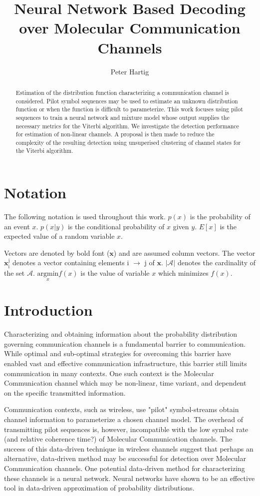 \documentclass[12pt,a4paper]{article}
\title{Neural Network Based Decoding over Molecular Communication Channels}
\author{Peter Hartig}
\begin{document}
\maketitle

\begin{abstract}
Estimation of the distribution function characterizing a communication channel is considered. Pilot symbol sequences may be used to estimate an unknown distribution function or when the function is difficult to parameterize. This work focuses using pilot sequences to train a neural network and mixture model whose output supplies the necessary metrics for the Viterbi algorithm. We investigate the detection performance for estimation of non-linear channels. A proposal is then made to reduce the complexity of the resulting detection using unsuperised clustering of channel states for the Viterbi algorithm. 
\end{abstract}

\newpage
\tableofcontents
\newpage
\section{Notation}
The following notation is used throughout this work.
$p(x)$ is the probability of an event $x$.
$p(x|y)$ is the conditional probability of $x$ given $y$.
$E[x]$ is the expected value of a random variable $x$.

Vectors  are denoted by bold font ($\mathbf{x}$) and are assumed column vectors.
The vector $\mathbf{x}_{\mathrm{i}}^{\mathrm{j}}$ denotes a vector containing elements i $\rightarrow$ j of $\mathbf{x}$. $|\mathcal{A}|$ denotes the cardinality of the set $\mathcal{A}$.
$\underset{x}{\text{argmin}} f(x)$ is the value of variable $x$ which minimizes $f(x)$.

\section{Introduction}
Characterizing and obtaining information about the probability distribution governing communication channels is a fundamental barrier to communication. While optimal and sub-optimal strategies for overcoming this barrier have enabled vast and effective communication infrastructure, this barrier still limits communication in many contexts. One such context is the Molecular Communication channel which may be non-linear, time variant, and dependent on the specific transmitted information.
\par
Communication contexts, such as wireless, use "pilot" symbol-streams obtain channel information to parameterize a chosen channel model. The overhead of transmitting pilot sequences is, however, incompatible with the low symbol rate (and relative coherence time?) of Molecular Communication channels. The success of this data-driven technique in wireless channels suggest that perhaps an alternative, data-driven method may be successful for detection over Molecular Communication channels. One potential data-driven method for characterizing these channels is a neural network. Neural networks have shown to be an effective tool in data-driven approximation of probability distributions.
\par
\end{document}
